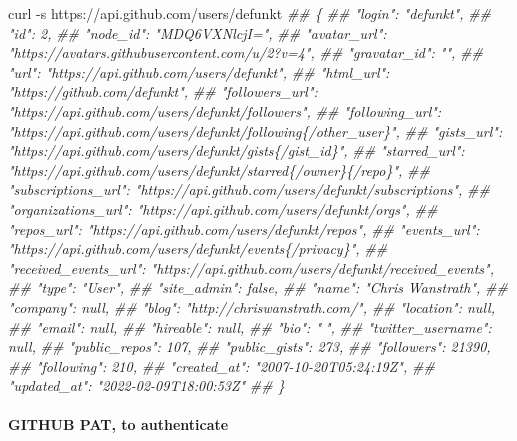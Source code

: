 \documentclass[
  10pt,
]{article}
\newenvironment{Shaded}{\begin{snugshade}}{\end{snugshade}}
\newcommand{\CommentTok}[1]{\textcolor[rgb]{0.56,0.35,0.01}{\textit{#1}}}
\newcommand{\NormalTok}[1]{#1}
\begin{document}
\begin{Shaded}
\begin{Highlighting}[]
\NormalTok{curl {-}s https://api.github.com/users/defunkt}
      \CommentTok{\#\# \{}
      \CommentTok{\#\#   "login": "defunkt",}
      \CommentTok{\#\#   "id": 2,}
      \CommentTok{\#\#   "node\_id": "MDQ6VXNlcjI=",}
      \CommentTok{\#\#   "avatar\_url": "https://avatars.githubusercontent.com/u/2?v=4",}
      \CommentTok{\#\#   "gravatar\_id": "",}
      \CommentTok{\#\#   "url": "https://api.github.com/users/defunkt",}
      \CommentTok{\#\#   "html\_url": "https://github.com/defunkt",}
      \CommentTok{\#\#   "followers\_url": "https://api.github.com/users/defunkt/followers",}
      \CommentTok{\#\#   "following\_url": "https://api.github.com/users/defunkt/following\{/other\_user\}",}
      \CommentTok{\#\#   "gists\_url": "https://api.github.com/users/defunkt/gists\{/gist\_id\}",}
      \CommentTok{\#\#   "starred\_url": "https://api.github.com/users/defunkt/starred\{/owner\}\{/repo\}",}
      \CommentTok{\#\#   "subscriptions\_url": "https://api.github.com/users/defunkt/subscriptions",}
      \CommentTok{\#\#   "organizations\_url": "https://api.github.com/users/defunkt/orgs",}
      \CommentTok{\#\#   "repos\_url": "https://api.github.com/users/defunkt/repos",}
      \CommentTok{\#\#   "events\_url": "https://api.github.com/users/defunkt/events\{/privacy\}",}
      \CommentTok{\#\#   "received\_events\_url": "https://api.github.com/users/defunkt/received\_events",}
      \CommentTok{\#\#   "type": "User",}
      \CommentTok{\#\#   "site\_admin": false,}
      \CommentTok{\#\#   "name": "Chris Wanstrath",}
      \CommentTok{\#\#   "company": null,}
      \CommentTok{\#\#   "blog": "http://chriswanstrath.com/",}
      \CommentTok{\#\#   "location": null,}
      \CommentTok{\#\#   "email": null,}
      \CommentTok{\#\#   "hireable": null,}
      \CommentTok{\#\#   "bio": "🍔",}
      \CommentTok{\#\#   "twitter\_username": null,}
      \CommentTok{\#\#   "public\_repos": 107,}
      \CommentTok{\#\#   "public\_gists": 273,}
      \CommentTok{\#\#   "followers": 21390,}
      \CommentTok{\#\#   "following": 210,}
      \CommentTok{\#\#   "created\_at": "2007{-}10{-}20T05:24:19Z",}
      \CommentTok{\#\#   "updated\_at": "2022{-}02{-}09T18:00:53Z"}
      \CommentTok{\#\# \}}
\end{Highlighting}
\end{Shaded}

\hypertarget{github-pat-to-authenticate}{%
\paragraph{GITHUB PAT, to
authenticate}\label{github-pat-to-authenticate}}
\end{document}
